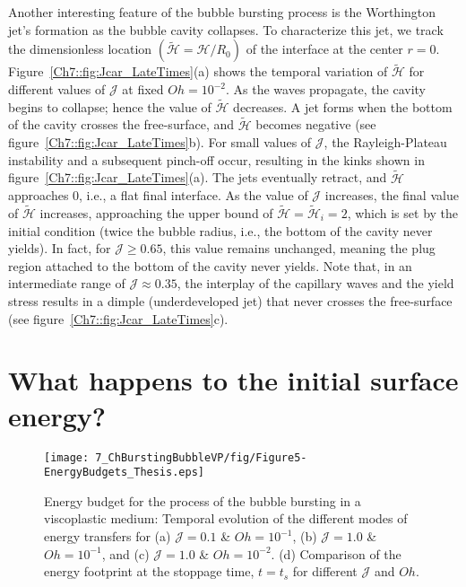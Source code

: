 Another interesting feature of the bubble bursting process is the Worthington jet's formation as the bubble cavity collapses. To characterize this jet, we track the dimensionless location $\left(\tilde{\mathcal{H}} = \mathcal{H}/R_0\right)$ of the interface at the center $r = 0$. 
Figure~\ref{Ch7::fig:Jcar_LateTimes}(a) shows the temporal variation of $\tilde{\mathcal{H}}$ for different values of $\mathcal{J}$ at fixed $Oh = 10^{-2}$. As the waves propagate, the cavity begins to collapse; hence the value of $\tilde{\mathcal{H}}$ decreases. A jet forms when the bottom of the cavity crosses the free-surface, and $\tilde{\mathcal{H}}$ becomes negative (see figure~\ref{Ch7::fig:Jcar_LateTimes}b). For small values of $\mathcal{J}$, the Rayleigh-Plateau instability and a subsequent pinch-off occur, resulting in the kinks shown in figure~\ref{Ch7::fig:Jcar_LateTimes}(a). The jets eventually retract, and $\tilde{\mathcal{H}}$ approaches $0$, i.e., a flat final interface. As the value of $\mathcal{J}$ increases, the final value of $\tilde{\mathcal{H}}$ increases, approaching the upper bound of $\tilde{\mathcal{H}} = \tilde{\mathcal{H}}_i = 2$, which is set by the initial condition (twice the bubble radius, i.e., the bottom of the cavity never yields). 
In fact, for $\mathcal{J} \ge 0.65$, this value remains unchanged, meaning the plug region attached to the bottom of the cavity never yields. Note that, in an intermediate range of $\mathcal{J} \approx 0.35$, the interplay of the capillary waves and the yield stress results in a dimple (underdeveloped jet) that never crosses the free-surface (see figure~\ref{Ch7::fig:Jcar_LateTimes}c). 

\section{What happens to the initial surface energy?}\label{Sec::Energy}

\begin{figure}
	\centering
	\texttt{[image: 7\_ChBurstingBubbleVP/fig/Figure5-EnergyBudgets\_Thesis.eps]}
	\caption{Energy budget for the process of the bubble bursting in a viscoplastic medium: Temporal evolution of the different modes of energy transfers for (a) $\mathcal{J} =0.1$ \& $Oh =10^{-1}$, (b) $\mathcal{J} = 1.0$ \& $Oh =10^{-1}$, and (c) $\mathcal{J} =1.0$ \& $Oh =10^{-2}$. (d) Comparison of the energy footprint at the stoppage time, $t = t_s$ for different $\mathcal{J}$ and $Oh$.}
	\label{Ch7::fig:EnergyBudget}
\end{figure}

